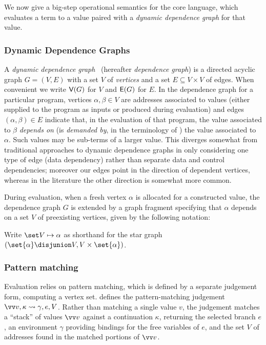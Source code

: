 We now give a big-step operational semantics for the core language, which evaluates a term to a value paired
with a \emph{dynamic dependence graph} for that value.

\subsubsection{Dynamic Dependence Graphs}
\label{sec:core:dependence-graphs}

A \emph{dynamic dependence graph}~\cite{agrawal90} (hereafter \emph{dependence graph}) is a directed acyclic
graph $G = (V,E)$ with a set $V$ of \emph{vertices} and a set $E \subseteq V \times V$ of edges. When
convenient we write $\textup{\textsf{V}}(G)$ for $V$ and $\textup{\textsf{E}}(G)$ for $E$. In the dependence graph for a particular program,
vertices $\alpha, \beta \in V$ are addresses associated to values (either supplied to the program as inputs or
produced during evaluation) and edges $(\alpha, \beta) \in E$ indicate that, in the evaluation of that
program, the value associated to $\beta$ \textit{depends on} (is \emph{demanded by}, in the terminology of
) the value associated to $\alpha$. Such values may be sub-terms of a larger value. This
diverges somewhat from traditional approaches to dynamic dependence graphs in only considering one type of
edge (data dependency) rather than separate data and control dependencies; moreover our edges point in the
direction of dependent vertices, whereas in the literature the other direction is somewhat more common.

During evaluation, when a fresh vertex $\alpha$ is allocated for a constructed value, the dependence graph $G$
is extended by a graph fragment specifying that $\alpha$ depends on a set $V$ of preexisting vertices, given
by the following notation:

\begin{definition}
Write $\inStar{V}{\alpha}$ as shorthand for the star graph $(\set{\alpha} \disjunion V, V \times
\set{\alpha})$.
\end{definition}




\subsubsection{Pattern matching}
\label{sec:core:semantics:pattern-matching}

Evaluation relies on pattern matching, which is defined by a separate judgement form,
computing a vertex set.
 defines the pattern-matching judgement $\seq{v}, \kappa \match \gamma, e, V$.
Rather than matching a single value $v$, the judgement matches a ``stack'' of values $\seq{v}$ against a
continuation $\kappa$, returning the selected branch $e$, an environment $\gamma$ providing bindings for the
free variables of $e$, and the set $V$ of addresses found in the matched portions of $\seq{v}$.

